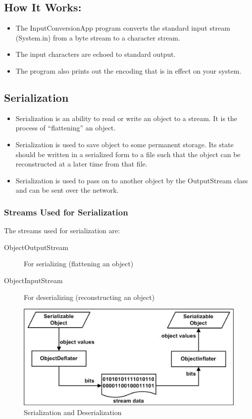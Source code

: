 \documentclass[11pt,a4paper]{article}
\begin{document}
\subsection*{How It Works:}
\begin{itemize}
    \item The InputConversionApp program converts the standard input stream (System.in) from a byte stream to a character stream.    \item The input characters are echoed to standard output.
    \item The program also prints out the encoding that is in effect on your system.
\end{itemize}

\subsection*{Serialization}
\begin{itemize}
    \item Serialization is an ability to read or write an object to a stream. It is the process of ``flattening'' an object. 
    \item Serialization is used to save object to some permanent storage. Its state should be written in a serialized form to a file such that the object can be reconstructed at a later time from that file. 
    \item Serialization is used to pass on to another object by the OutputStream class and can be sent over the network. 
\end{itemize}

\subsubsection*{Streams Used for Serialization}
The streams used for serialization are: 
\begin{description}
    \item [ObjectOutputStream]  For serializing (flattening an object) 
    \item [ObjectInputStream]  For deserializing (reconstructing an object) 
\end{description}
\begin{figure}[H]
 \begin{center}
   \includegraphics[scale=0.8]{serialization.jpg}
   \caption{Serialization and Deserialization}
 \end{center}
 \end{figure}
\end{document}
